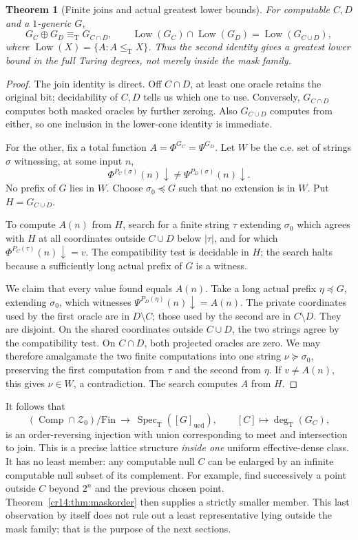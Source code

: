 \documentclass[11pt,a4paper]{article}
\newcommand{\leT}{\leq_{\mathrm T}}
\newcommand{\eqT}{\equiv_{\mathrm T}}
\newcommand{\degT}{\operatorname{deg}_{\mathrm T}}
\newcommand{\ued}{\mathrm{ued}}
\newcommand{\Znull}{\mathcal Z_0}
\newcommand{\Comp}{\operatorname{Comp}}
\newcommand{\Fin}{\mathrm{Fin}}
\newcommand{\Low}{\operatorname{Low}}
\newcommand{\Spec}{\operatorname{Spec}_{\mathrm T}}
\newcommand{\extends}{\succeq}
\newcommand{\prefix}{\preccurlyeq}
\newtheorem{theorem}{Theorem}[section]
\theoremstyle{definition}
\theoremstyle{remark}
\begin{document}
\begin{theorem}[Finite joins and actual greatest lower bounds]
\label{cr14:thm:masklattice}
For computable $C,D$ and a $1$-generic $G$,
\[
 G_C\oplus G_D\eqT G_{C\cap D},
 \qquad
 \Low(G_C)\cap\Low(G_D)=\Low(G_{C\cup D}),
\]
where $\Low(X)=\{A:A\leT X\}$. Thus the second identity gives a greatest
lower bound in the full Turing degrees, not merely inside the mask family.
\end{theorem}
\begin{proof}
The join identity is direct. Off $C\cap D$, at least one oracle retains
the original bit; decidability of $C,D$ tells us which one to use.
Conversely, $G_{C\cap D}$ computes both masked oracles by further zeroing.
Also $G_{C\cup D}$ computes from either, so one inclusion in the lower-cone
identity is immediate.

For the other, fix a total function
$A=\Phi^{G_C}=\Psi^{G_D}$. Let $W$ be the c.e. set of strings $\sigma$
witnessing, at some input $n$,
\[
 \Phi^{P_C(\sigma)}(n)\downarrow\ne
       \Psi^{P_D(\sigma)}(n)\downarrow.
\]
No prefix of $G$ lies in $W$. Choose $\sigma_0\prefix G$ such that no
extension is in $W$. Put $H=G_{C\cup D}$.

To compute $A(n)$ from $H$, search for a finite string $\tau$ extending
$\sigma_0$ which agrees with $H$ at all coordinates outside $C\cup D$
below $|\tau|$, and for which
$\Phi^{P_C(\tau)}(n)\downarrow=v$. The compatibility test is decidable
in $H$; the search halts because a sufficiently long actual prefix of $G$
is a witness.

We claim that every value found equals $A(n)$. Take a long actual prefix
$\eta\prefix G$, extending $\sigma_0$, which witnesses
$\Psi^{P_D(\eta)}(n)\downarrow=A(n)$. The private coordinates used by the
first oracle are in $D\setminus C$; those used by the second are in
$C\setminus D$. They are disjoint. On the shared coordinates outside
$C\cup D$, the two strings agree by the compatibility test. On
$C\cap D$, both projected oracles are zero. We may therefore amalgamate
the two finite computations into one string $\nu\extends\sigma_0$,
preserving the first computation from $\tau$ and the second from $\eta$.
If $v\ne A(n)$, this gives $\nu\in W$, a contradiction. The search
computes $A$ from $H$.
\end{proof}

It follows that
\[
 (\Comp\cap\Znull)/\Fin\ \longrightarrow\ \Spec([G]_{\ued}),
 \qquad [C]\longmapsto\degT(G_C),
\]
is an order-reversing injection with union corresponding to meet and
intersection to join. This is a precise lattice structure \emph{inside one}
uniform effective-dense class. It has no least member: any computable null
$C$ can be enlarged by an infinite computable null subset of its complement.
For example, find successively a point outside $C$ beyond $2^n$ and the
previous chosen point. Theorem~\ref{cr14:thm:maskorder} then supplies a strictly
smaller member. This last observation by itself does not rule out a least
representative lying outside the mask family; that is the purpose of the
next sections.
\end{document}
